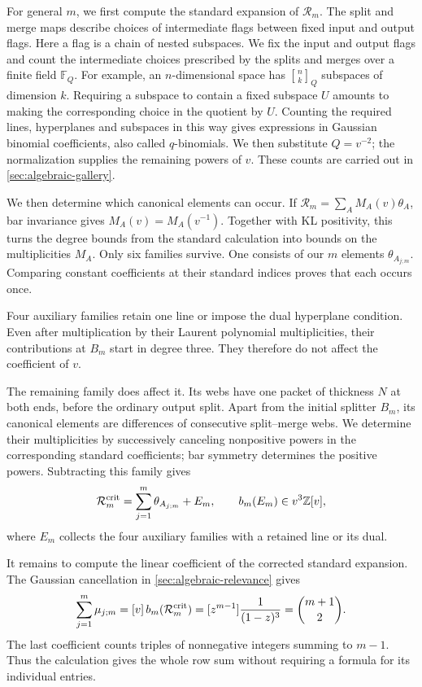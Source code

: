 \documentclass[a4paper,11pt]{amsart}
\numberwithin{equation}{subsection}
\theoremstyle{plain}
\theoremstyle{definition}
\theoremstyle{remark}
\newcommand{\qbinom}[2]{\genfrac{[}{]}{0pt}{}{#1}{#2}}
\begin{document}
For general $m$, we first compute the standard expansion of
$\mathcal R_m$. The split and merge maps describe choices of
intermediate flags between fixed input and output flags.
Here a flag is a chain of nested subspaces. We fix the input
and output flags and count the intermediate choices prescribed
by the splits and merges over a finite field $\mathbb F_Q$.
For example, an $n$-dimensional space has $\qbinom{n}{k}_Q$
subspaces of dimension $k$. Requiring a subspace to contain
a fixed subspace $U$ amounts to making the corresponding
choice in the quotient by $U$. Counting the required lines,
hyperplanes and subspaces in this way gives expressions in
Gaussian binomial coefficients, also called $q$-binomials.
We then substitute $Q=v^{-2}$; the normalization supplies
the remaining powers of $v$.
These counts are carried out in \autoref{sec:algebraic-gallery}.

We then determine which canonical elements can occur.
If $\mathcal R_m=\sum_A M_A(v)\theta_A$, bar invariance gives
$M_A(v)=M_A(v^{-1})$. Together with KL positivity, this turns the
degree bounds from the standard calculation into bounds on the
multiplicities $M_A$. Only six families survive.
One consists of our $m$ elements $\theta_{A_{j;m}}$.
Comparing constant coefficients at their standard indices proves
that each occurs once.

Four auxiliary families retain one line or impose the dual
hyperplane condition. Even after multiplication by their
Laurent polynomial multiplicities, their contributions at $B_m$
start in degree three. They therefore do not affect the
coefficient of $v$.

The remaining family does affect it. Its webs have one packet
of thickness $N$ at both ends, before the ordinary output split.
Apart from the initial splitter $B_m$, its canonical elements
are differences of consecutive split--merge webs.
We determine their multiplicities by successively canceling
nonpositive powers in the corresponding standard coefficients;
bar symmetry determines the positive powers.
Subtracting this family gives
\[
\mathcal R_m^{\rm crit}
=\sum_{j=1}^{m}\theta_{A_{j;m}}+E_m,
\qquad b_m(E_m)\in v^3\mathbb Z[v],
\]
where $E_m$ collects the four auxiliary families with a retained
line or its dual.

It remains to compute the linear coefficient of the corrected
standard expansion. The Gaussian cancellation in
\autoref{sec:algebraic-relevance} gives
\[
\sum_{j=1}^{m}\mu_{j;m}
=[v]\,b_m(\mathcal R_m^{\rm crit})
=[z^{m-1}]\frac{1}{(1-z)^3}
=\binom{m+1}{2}.
\]
The last coefficient counts triples of nonnegative integers
summing to $m-1$. Thus the calculation gives the whole row sum
without requiring a formula for its individual entries.
\end{document}
